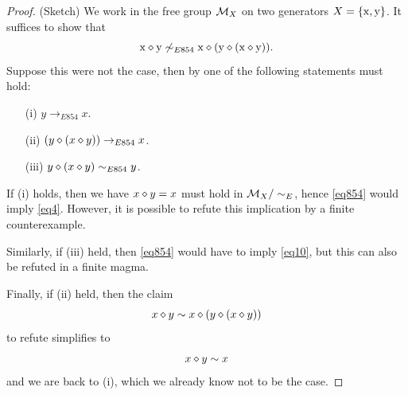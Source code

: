 \begin{proof}(Sketch)
  We work in the free group ${\mathcal{M}}_X$ on two generators $X = \{\mathrm{x},\mathrm{y}\}$.  It suffices to show that
$$  \mathrm{x} \diamond \mathrm{y} \not \sim_{E854} \mathrm{x} \diamond (\mathrm{y} \diamond (\mathrm{x} \diamond \mathrm{y})).$$
Suppose this were not the case, then by  one of the following statements must hold:
\begin{itemize}
\item[(i)] $y \to_{E854} x$.
\item[(ii)] $(y \diamond (x \diamond y)) \to_{E854} x$.
\item[(iii)] $y \diamond (x \diamond y) \sim_{E854} y$.
\end{itemize}
If (i) holds, then we have $x \diamond y = x$ must hold in ${\mathcal{M}}_X/\sim_E$, hence \eqref{eq854} would imply \eqref{eq4}.  However, it is possible to refute this implication by a finite counterexample.

Similarly, if (iii) held, then \eqref{eq854} would have to imply \eqref{eq10}, but this can also be refuted in a finite magma.

Finally, if (ii) held, then the claim
$$  x \diamond y \sim x \diamond (y \diamond (x \diamond y))$$
to refute simplifies to
$$  x \diamond y \sim x$$
and we are back to (i), which we already know not to be the case.
\end{proof}
